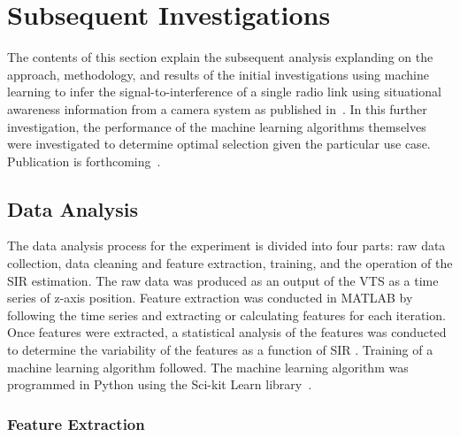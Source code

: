 \section{Subsequent Investigations}

The contents of this section explain the subsequent analysis explanding on the approach, methodology, and results of the initial investigations using machine learning to infer the signal-to-interference of a single radio link using situational awareness information from a camera system as published in~\cite{CandellISIE2019.Conf}.  In this further investigation, the performance of the machine learning algorithms themselves were investigated to determine optimal selection given the particular use case. Publication is forthcoming~\cite{CandellIJAMT2020.Jrml}.


\subsection{Data Analysis}\label{ftml-jrnl:sec:dataanalysis}


The data analysis process for the experiment
is divided into four parts: raw data collection, data cleaning and feature extraction, training, and the operation of the SIR estimation. The raw data was produced as an output of the VTS as a time series of z-axis position. Feature extraction was conducted in MATLAB by following the time series and extracting or calculating features for each iteration.  Once features were extracted, a statistical analysis of the features was conducted to determine the variability of the features as a function of SIR \cite{Candell_ISIT_2019}. Training of a machine learning algorithm followed. The machine learning algorithm was programmed in Python using the Sci-kit Learn library~\cite{SCIKITLEARN}.

\subsubsection{Feature Extraction}\label{ftml-jrnl:sec:data:feats}

